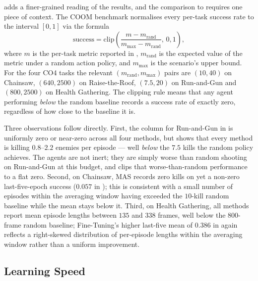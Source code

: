  adds a finer-grained reading of the
results, and the comparison to  requires one
piece of context. The COOM benchmark normalises every per-task
success rate to the interval $[0,1]$ via the formula
\begin{equation}
    \mathrm{success}
    = \mathrm{clip}\!\left(
        \frac{m - m_{\mathrm{rand}}}{m_{\max} - m_{\mathrm{rand}}},
        \, 0, 1
    \right),
    \label{eq:succnorm}
\end{equation}
where $m$ is the per-task metric reported in
, $m_{\mathrm{rand}}$ is the
expected value of the metric under a random action policy,
and $m_{\max}$ is the scenario's upper bound. For the four
CO4 tasks the relevant $(m_{\mathrm{rand}}, m_{\max})$ pairs
are $(10, 40)$ on Chainsaw, $(640, 2500)$ on Raise-the-Roof,
$(7.5, 20)$ on Run-and-Gun and $(800, 2500)$ on Health
Gathering. The clipping rule means that any agent performing
\emph{below} the random baseline records a success rate of
exactly zero, regardless of how close to the baseline it is.

Three observations follow directly. First, the column for
Run-and-Gun in  is uniformly zero or
near-zero across all four methods, but
 shows that every method is killing
$0.8$--$2.2$ enemies per episode --- well \emph{below} the
$7.5$ kills the random policy achieves. The agents are not
inert; they are simply worse than random shooting on
Run-and-Gun at this budget, and  clips that
worse-than-random performance to a flat zero. Second, on
Chainsaw, MAS records zero kills on 
yet a non-zero last-five-epoch success ($0.057$ in
); this is consistent with a small number
of episodes within the averaging window having exceeded the
$10$-kill random baseline while the mean stays below it.
Third, on Health Gathering, all methods report mean episode
lengths between $135$ and $338$ frames, well below the
$800$-frame random baseline; Fine-Tuning's higher last-five
mean of $0.386$ in  again reflects a
right-skewed distribution of per-episode lengths within the
averaging window rather than a uniform improvement.

\subsection{Learning Speed}

\begin{table}[t]
    \centering
    \caption{Number of in-task epochs needed to reach half of the
        in-task peak success rate. Lower is faster. ``---'' means
        the in-task peak success rate was zero.}
    \label{tab:learning_speed}
\end{table}

